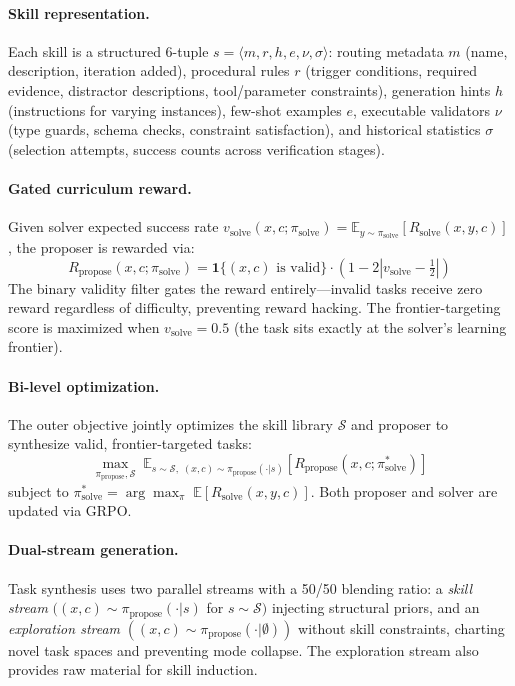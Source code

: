 \documentclass[11pt,a4paper]{article}
\begin{document}
\paragraph{Skill representation.}
Each skill is a structured 6-tuple $s = \langle m, r, h, e, \nu, \sigma \rangle$: routing metadata $m$ (name, description, iteration added), procedural rules $r$ (trigger conditions, required evidence, distractor descriptions, tool/parameter constraints), generation hints $h$ (instructions for varying instances), few-shot examples $e$, executable validators $\nu$ (type guards, schema checks, constraint satisfaction), and historical statistics $\sigma$ (selection attempts, success counts across verification stages).

\paragraph{Gated curriculum reward.}
Given solver expected success rate $v_{\text{solve}}(x,c;\pi_{\text{solve}}) = \mathbb{E}_{y \sim \pi_{\text{solve}}}[R_{\text{solve}}(x,y,c)]$, the proposer is rewarded via:
\begin{equation}
    R_{\text{propose}}(x,c;\pi_{\text{solve}}) = \mathbf{1}\{(x,c)\text{ is valid}\} \cdot \left(1 - 2\left|v_{\text{solve}} - \tfrac{1}{2}\right|\right)
\end{equation}
The binary validity filter gates the reward entirely---invalid tasks receive zero reward regardless of difficulty, preventing reward hacking. The frontier-targeting score is maximized when $v_{\text{solve}} = 0.5$ (the task sits exactly at the solver's learning frontier).

\paragraph{Bi-level optimization.}
The outer objective jointly optimizes the skill library $\mathcal{S}$ and proposer to synthesize valid, frontier-targeted tasks:
\begin{equation}
    \max_{\pi_{\text{propose}}, \mathcal{S}}\; \mathbb{E}_{s \sim \mathcal{S},\; (x,c) \sim \pi_{\text{propose}}(\cdot|s)}\left[R_{\text{propose}}(x,c;\pi^*_{\text{solve}})\right]
\end{equation}
subject to $\pi^*_{\text{solve}} = \arg\max_\pi\; \mathbb{E}[R_{\text{solve}}(x,y,c)]$. Both proposer and solver are updated via GRPO.

\paragraph{Dual-stream generation.}
Task synthesis uses two parallel streams with a 50/50 blending ratio: a \emph{skill stream} $((x,c) \sim \pi_{\text{propose}}(\cdot|s)$ for $s \sim \mathcal{S})$ injecting structural priors, and an \emph{exploration stream} $((x,c) \sim \pi_{\text{propose}}(\cdot|\emptyset))$ without skill constraints, charting novel task spaces and preventing mode collapse. The exploration stream also provides raw material for skill induction.
\end{document}
